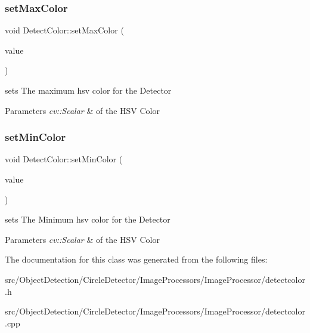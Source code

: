 \subsubsection{\texorpdfstring{set\+Max\+Color}{setMaxColor}}
{\footnotesize\ttfamily void Detect\+Color\+::set\+Max\+Color (\begin{DoxyParamCaption}\item[{const cv\+::\+Scalar \&}]{value }\end{DoxyParamCaption})\hspace{0.3cm}{\ttfamily [slot]}}



sets The maximum hsv color for the Detector 


\begin{DoxyParams}{Parameters}
{\em cv\+::\+Scalar} & of the H\+SV Color \\
\hline
\end{DoxyParams}
\mbox{\label{class_image_processor_1_1_detect_color_af9f1efdf1535b8a8516c3feb536fc8b8}} 
\subsubsection{\texorpdfstring{set\+Min\+Color}{setMinColor}}
{\footnotesize\ttfamily void Detect\+Color\+::set\+Min\+Color (\begin{DoxyParamCaption}\item[{const cv\+::\+Scalar \&}]{value }\end{DoxyParamCaption})\hspace{0.3cm}{\ttfamily [slot]}}



sets The Minimum hsv color for the Detector 


\begin{DoxyParams}{Parameters}
{\em cv\+::\+Scalar} & of the H\+SV Color \\
\hline
\end{DoxyParams}


The documentation for this class was generated from the following files\+:\begin{DoxyCompactItemize}
\item 
src/\+Object\+Detection/\+Circle\+Detector/\+Image\+Processors/\+Image\+Processor/detectcolor.\+h\item 
src/\+Object\+Detection/\+Circle\+Detector/\+Image\+Processors/\+Image\+Processor/detectcolor.\+cpp\end{DoxyCompactItemize}
